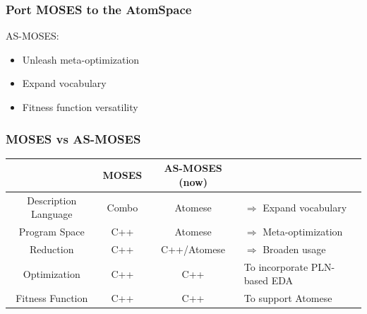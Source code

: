\documentclass[aspectratio=169]{beamer}
\begin{document}
\begin{frame}
  \frametitle{Port MOSES to the AtomSpace}

  AS-MOSES:
  \begin{itemize}
  \item Unleash meta-optimization
  \item Expand vocabulary
  \item Fitness function versatility
  \end{itemize}

\end{frame}

\begin{frame}

  \frametitle{MOSES vs AS-MOSES}

  \begin{tabular}{ c || c | c | l}
    & MOSES & AS-MOSES (now) & \\
    \hline \hline
    Description Language & Combo & Atomese & \alert{$\Rightarrow$ Expand vocabulary}\\
    \hline
    Program Space & C++ & Atomese & \alert{$\Rightarrow$ Meta-optimization}\\
    \hline
    Reduction & C++ & C++/Atomese & \alert{$\Rightarrow$ Broaden usage}\\
    \hline
    Optimization & C++ & C++ & To incorporate PLN-based EDA\\
    \hline
    Fitness Function & C++ & C++ & To support Atomese\\
    \hline
\end{tabular}

\end{frame}
\end{document}
